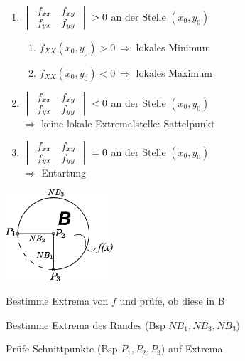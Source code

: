 \documentclass[a4paper]{article}
\begin{document}
		\begin{falgo}
				\vspace{-4mm}
			\begin{multicols}{2}
			\begin{enumerate}
				\item
				$\left \bracevert
				\begin{array}{cc}
				f_{xx} & f_{xy} \\
				f_{yx} & f_{yy}
				\end{array}
				\right \bracevert > 0$ an der Stelle $(x_0,y_0)$
						\vspace{-2mm}
					\begin{enumerate}
						\item $f_{XX}(x_0,y_0)>0\:\Rightarrow$ lokales Minimum
						\item $f_{XX}(x_0,y_0)<0\:\Rightarrow$ lokales Maximum
					\end{enumerate}
				\item
				$\left \bracevert
				\begin{array}{cc}
				f_{xx} & f_{xy} \\
				f_{yx} & f_{yy}
				\end{array}
				\right \bracevert < 0$ an der Stelle $(x_0,y_0)$\\
				$\Rightarrow$ keine lokale Extremalstelle: Sattelpunkt
				\item
				$\left \bracevert
				\begin{array}{cc}
				f_{xx} & f_{xy} \\
				f_{yx} & f_{yy}
				\end{array}
				\right \bracevert = 0$ an der Stelle $(x_0,y_0)$\\
				$\Rightarrow$ Entartung
			\end{enumerate}
			\end{multicols}
		\end{falgo}
		\begin{fsatz}
			\begin{multicols}{2}
			{\centering \includegraphics[width=4cm]{extremalstellen_nb}}
			\begin{enumerate_compact}
				\item Bestimme Extrema von $f$ und prüfe, ob diese in B
				\item Bestimme Extrema des Randes (Bsp $NB_1, NB_3, NB_3$)
				\item Prüfe Schnittpunkte (Bsp $P_1, P_2, P_3$) auf Extrema
			\end{enumerate_compact}
			\end{multicols}
		\end{fsatz}
\end{document}
